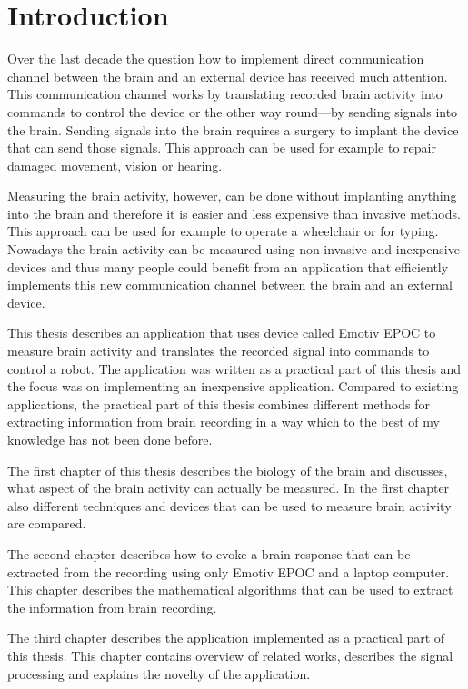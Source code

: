 
\chapter*{Introduction}

Over the last decade the question how to implement direct communication channel between the brain and an external device has received much attention. This communication channel works by translating recorded brain activity into commands to control the device or the other way round---by sending signals into the brain. Sending signals into the brain requires a surgery to implant the device that can send those signals. This approach can be used for example to repair damaged movement, vision or hearing.

Measuring the brain activity, however, can be done without implanting anything into the brain and therefore it is easier and less expensive than invasive methods. This approach can be used for example to operate a wheelchair or for typing. Nowadays the brain activity can be measured using non-invasive and inexpensive devices and thus many people could benefit from an application that efficiently implements this new communication channel between the brain and an external device.

This thesis describes an application that uses device called Emotiv EPOC to measure brain activity and translates the recorded signal into commands to control a robot. The application was written as a practical part of this thesis and the focus was on implementing an inexpensive application. Compared to existing applications, the practical part of this thesis combines different methods for extracting information from brain recording in a way which to the best of my knowledge has not been done before.

The first chapter of this thesis describes the biology of the brain and discusses, what aspect of the brain activity can actually be measured. In the first chapter also different techniques and devices that can be used to measure brain activity are compared.

The second chapter describes how to evoke a brain response that can be extracted from the recording using only Emotiv EPOC and a laptop computer. This chapter describes the mathematical algorithms that can be used to extract the information from brain recording.

The third chapter describes the application implemented as a practical part of this thesis. This chapter contains overview of related works, describes the signal processing and explains the novelty of the application.
